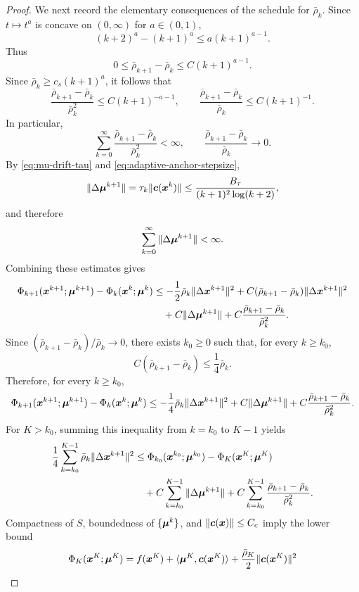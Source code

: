 \documentclass[10pt]{article}
\begin{document}
\begin{proof}
We next record the elementary consequences of the schedule for
$\bar\rho_k$.  Since $t\mapsto t^a$ is concave on $(0,\infty)$ for
$a\in(0,1)$,
\[
    (k+2)^a-(k+1)^a
    \le
    a(k+1)^{a-1}.
\]
Thus
\[
    0\le
    \bar\rho_{k+1}-\bar\rho_k
    \le
    C(k+1)^{a-1}.
\]
Since $\bar\rho_k\ge c_s(k+1)^a$, it follows that
\[
    \frac{\bar\rho_{k+1}-\bar\rho_k}{\bar\rho_k^2}
    \le
    C(k+1)^{-a-1},
    \qquad
    \frac{\bar\rho_{k+1}-\bar\rho_k}{\bar\rho_k}
    \le
    C(k+1)^{-1}.
\]
In particular,
\[
    \sum_{k=0}^{\infty}
    \frac{\bar\rho_{k+1}-\bar\rho_k}{\bar\rho_k^2}
    <
    \infty,
    \qquad
    \frac{\bar\rho_{k+1}-\bar\rho_k}{\bar\rho_k}
    \to0 .
\]
By \eqref{eq:mu-drift-tau} and \eqref{eq:adaptive-anchor-stepsize},
\[
    \|\Delta\bm{\mu}^{k+1}\|
    =
    \tau_k\|\bm{c}(\bm{x}^k)\|
    \le
    \frac{B_\tau}{(k+1)^2\log(k+2)},
\]
and therefore
\[
    \sum_{k=0}^{\infty}\|\Delta\bm{\mu}^{k+1}\|<\infty.
\]
Combining these estimates gives
\[
\begin{aligned}
    \Phi_{k+1}(\bm{x}^{k+1};\bm{\mu}^{k+1})-\Phi_k(\bm{x}^k;\bm{\mu}^k)
    &\le
    -\frac{1}{2}\bar\rho_k\|\Delta\bm{x}^{k+1}\|^2
    +C(\bar\rho_{k+1}-\bar\rho_k)
    \|\Delta\bm{x}^{k+1}\|^2\\
    &\quad+
    C\|\Delta\bm{\mu}^{k+1}\|
    +C\frac{\bar\rho_{k+1}-\bar\rho_k}{\bar\rho_k^2}.
\end{aligned}
\]
Since $(\bar\rho_{k+1}-\bar\rho_k)/\bar\rho_k\to0$, there exists
$k_0\ge0$ such that, for every $k\ge k_0$,
\[
    C(\bar\rho_{k+1}-\bar\rho_k)
    \le
    \frac{1}{4}\bar\rho_k .
\]
Therefore, for every $k\ge k_0$,
\[
    \Phi_{k+1}(\bm{x}^{k+1};\bm{\mu}^{k+1})-\Phi_k(\bm{x}^k;\bm{\mu}^k)
    \le
    -\frac{1}{4}\bar\rho_k\|\Delta\bm{x}^{k+1}\|^2
    +C\|\Delta\bm{\mu}^{k+1}\|
    +C\frac{\bar\rho_{k+1}-\bar\rho_k}{\bar\rho_k^2}.
\]
For $K>k_0$, summing this inequality from $k=k_0$ to $K-1$ yields
\[
\begin{aligned}
    \frac{1}{4}
    \sum_{k=k_0}^{K-1}
    \bar\rho_k\|\Delta\bm{x}^{k+1}\|^2
    &\le
    \Phi_{k_0}(\bm{x}^{k_0};\bm{\mu}^{k_0})
    -
    \Phi_K(\bm{x}^K;\bm{\mu}^K)\\
    &\quad+
    C\sum_{k=k_0}^{K-1}\|\Delta\bm{\mu}^{k+1}\|
    +
    C\sum_{k=k_0}^{K-1}
    \frac{\bar\rho_{k+1}-\bar\rho_k}{\bar\rho_k^2}.
\end{aligned}
\]
Compactness of $S$, boundedness of $\{\bm{\mu}^k\}$, and
$\|\bm{c}(\bm{x})\|\le C_c$ imply the lower bound
\[
    \begin{aligned}
    \Phi_K(\bx^K;\bmu^K)
    &=
    f(\bx^K)
    +\langle\bmu^K,\bc(\bx^K)\rangle
    +\frac{\bar\rho_K}{2}\|\bc(\bx^K)\|^2\\

\end{aligned}\]
\end{proof}
\end{document}
